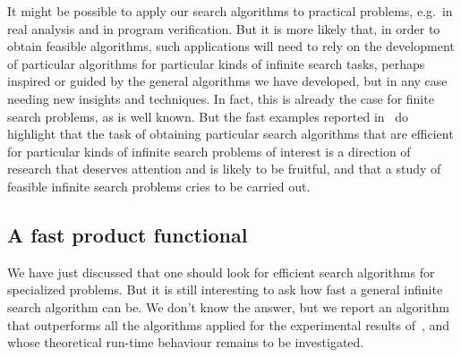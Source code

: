 \documentclass{LMCS}
\begin{document}
It might be possible to apply our search algorithms to practical
problems, e.g.\ in real analysis and in program verification.  But it
is more likely that, in order to obtain feasible algorithms, such
applications will need to rely on the development of particular
algorithms for particular kinds of infinite search tasks, perhaps
inspired or guided by the general algorithms we have developed, but in
any case needing new insights and techniques.  In fact, this is
already the case for finite search problems, as is well known.  But
the fast examples reported in~\cite{escardo:lics07} do highlight that
the task of obtaining particular search algorithms that are efficient
for particular kinds of infinite search problems of interest is a
direction of research that deserves attention and is likely to be
fruitful, and that a study of feasible infinite search problems cries
to be carried out.

\subsection{A fast product functional}

We have just discussed that one should look for efficient search
algorithms for specialized problems.  But it is still interesting to
ask how fast a general infinite search algorithm can be.  We don't
know the answer, but we report an algorithm that outperforms all the
algorithms applied for the experimental results
of~\cite{escardo:lics07}, and whose theoretical run-time behaviour
remains to be investigated.

\newcommand{\Root}{\operatorname{root}}
\newcommand{\Left}{\operatorname{left}}
\newcommand{\Right}{\operatorname{right}}
\newcommand{\branch}{\operatorname{branch}} 
\end{document}
